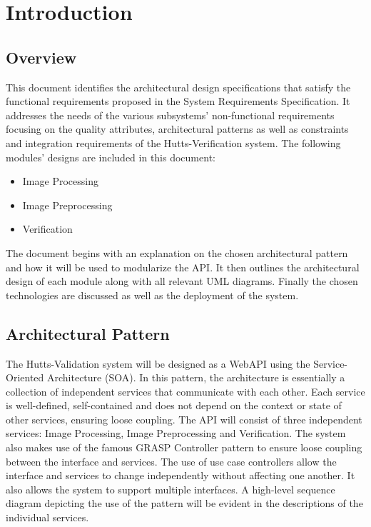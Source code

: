 \documentclass{article}
\begin{document}
\cleardoublepage
\thispagestyle{empty}
\tableofcontents
\newpage

\setcounter{page}{1}
	\section{Introduction}
	\subsection{Overview}
This document identifies the architectural design specifications that satisfy the functional requirements proposed in the System Requirements Specification. It addresses the needs of the various subsystems' non-functional requirements focusing on the quality attributes, architectural patterns as well as constraints and integration requirements of the Hutts-Verification system.\newline \newline 
The following modules' designs are included in this document:
\begin{itemize}
	\item Image Processing
	\item Image Preprocessing
	\item Verification
\end{itemize}
The document begins with an explanation on the chosen architectural pattern and how it will be used to modularize the API. It then outlines the architectural design of each module along with all relevant UML diagrams. Finally the chosen technologies are discussed as well as the deployment of the system. 

\subsection{Architectural Pattern}
The Hutts-Validation system will be designed as a WebAPI using the Service-Oriented Architecture (SOA). In this pattern, the architecture is essentially a collection of independent services that communicate with each other. Each service is well-defined, self-contained and does not depend on the context or state of other services, ensuring loose coupling. The API will consist of three independent services: Image Processing, Image Preprocessing and Verification. 
The system also makes use of the famous GRASP Controller pattern to ensure loose coupling between the interface and services. The use of use case controllers allow the interface and services to change independently without affecting one another. It also allows the system to support multiple interfaces. A high-level sequence diagram depicting the use of the pattern will be evident in the descriptions of the individual services.
\end{document}
